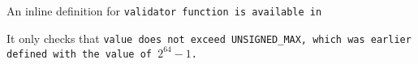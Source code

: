 An inline definition for \tt{validator} function is available in

It only checks that \tt{value} does not exceed \tt{UNSIGNED_MAX},
which was earlier defined with the value of $2^{64} - 1$.
